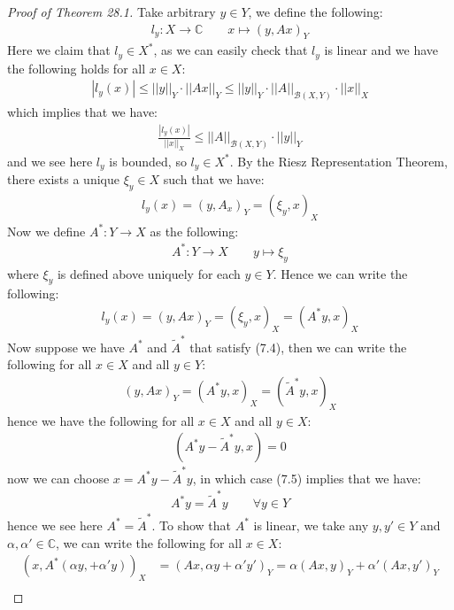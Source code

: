 \documentclass[11pt]{book}
\theoremstyle{break}
\theoremstyle{break}
\newcommand{\C}{\mathbb{C}}
\newcommand{\that}[1]{\widetilde{#1}}
\begin{document}
\begin{proof}[Proof of Theorem 28.1]
Take arbitrary $y \in Y$, we define the following:
\begin{align*}
l_y:X\to \C \qquad x \mapsto (y,Ax)_Y
\end{align*}
Here we claim that $l_y \in X^*$, as we can easily check that $l_y$ is linear and we have the following holds for all $x \in X$:
\begin{align*}
|l_y(x)| \leq ||y||_Y \cdot ||Ax||_Y \leq ||y||_Y \cdot ||A||_{\mathcal{B}(X,Y)}\cdot ||x||_X
\end{align*}
which implies that we have:
\begin{align*}
\frac{|l_y(x)|}{||x||_X} \leq ||A||_{\mathcal{B}(X,Y)}\cdot ||y||_Y
\end{align*}
and we see here $l_y$ is bounded, so $l_y \in X^*$. By the Riesz Representation Theorem, there exists a unique $\xi_y \in X$ such that we have:
\begin{align*}
l_y(x) = (y, A_x)_Y = (\xi_y, x)_X
\end{align*}
Now we define $A^*:Y \to X$ as the following:
\begin{align}
A^*: Y \to X \qquad y \mapsto \xi_y
\end{align}
where $\xi_y $ is defined above uniquely for each $y \in Y$. Hence we can write the following:
\begin{align*}
l_y(x) = (y,Ax)_Y = (\xi_y, x)_X = (A^* y , x)_X
\end{align*}
Now suppose we have $A^*$ and $\that{A}^*$ that satisfy (7.4), then we can write the following for all $x \in X$ and all $y \in Y$:
\begin{align*}
(y,Ax)_Y = (A^*y,x)_X = (\that{A}^*y,x)_X
\end{align*}
hence we have the following for all $x \in X$ and all $y \in X$:
\begin{align}
(A^*y-\that{A}^*y, x) = 0
\end{align}
now we can choose $x =A^*y - \that{A}^*y$, in which case (7.5) implies that we have:
\begin{align*}
A^*y = \that{A}^* y \qquad \forall	 y \in Y
\end{align*}
hence we see here $A^* = \that{A}^*$. To show that $A^*$ is linear, we take any $y,y'\in Y$ and $\alpha,\alpha' \in \C$, we can write the following for all $x \in X$:
\begin{align*}
(x, A^*(\alpha y, + \alpha' y))_X &= (Ax, \alpha y +\alpha' y')_Y = \alpha(Ax, y)_Y + \alpha'(Ax,y')_Y \\

\end{align*}
\end{proof}
\end{document}
